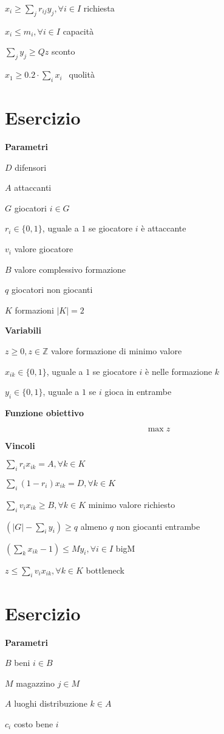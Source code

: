 \documentclass[10pt,a4paper,twoside,openright]{book}
\newcounter{es}
\newcommand{\Es}{
	\stepcounter{es}
	\section{Esercizio \arabic{es}}
	}
\newcommand{\Par}{\textbf{Parametri}}
\newcommand{\Var}{\textbf{Variabili}}
\newcommand{\Fob}{\textbf{Funzione obiettivo}}
\newcommand{\Vin}{\textbf{Vincoli}}
\begin{document}
$x_{i} \geqslant \sum _{j} r_{ij} y_{j} ,\forall i\in I$ richiesta

$x_{i} \leq m_{i} ,\forall i\in I$ capacità

$\sum _{j} y_{j} \geqslant Qz$ sconto

$x_{1} \geqslant 0.2\cdot \sum _{i} x_{i} \ \ $ quolità

\Es

\Par

$D$ difensori

$A$ attaccanti

$G$ giocatori $i\in G$

$r_{i} \in \{0,1\}$, uguale a $1$ se giocatore $i$ è attaccante

$v_{i}$ valore giocatore

$B$ valore complessivo formazione

$q$ giocatori non giocanti

$K$ formazioni $|K|=2$

\Var

$z\geqslant 0,z\in \mathbb{Z}$ valore formazione di minimo valore

$x_{ik} \in \{0,1\}$, uguale a $1$ se giocatore $i$ è nelle formazione $k$

$y_{i} \in \{0,1\}$, uguale a $1$ se $i$ gioca in entrambe

\Fob

\begin{equation*}
	\max z
\end{equation*}

\Vin

$\sum _{i} r_{i} x_{ik} =A,\forall k\in K$

$\sum _{i}( 1-r_{i}) x_{ik} =D,\forall k\in K$

$\sum _{i} v_{i} x_{ik} \geqslant B,\forall k\in K$ minimo valore richiesto

$\left( |G|-\sum _{i} y_{i}\right) \geqslant q$ almeno $q$ non giocanti entrambe

$\left(\sum _{k} x_{ik} -1\right) \leq My_{i} ,\forall i\in I$ bigM

$z\leq \sum _{i} v_{i} x_{ik} ,\forall k\in K$ bottleneck

\Es

\Par

$B$ beni $i\in B$

$M$ magazzino $j\in M$

$A$ luoghi distribuzione $k\in A$

$c_{i}$ costo bene $i$
\end{document}
